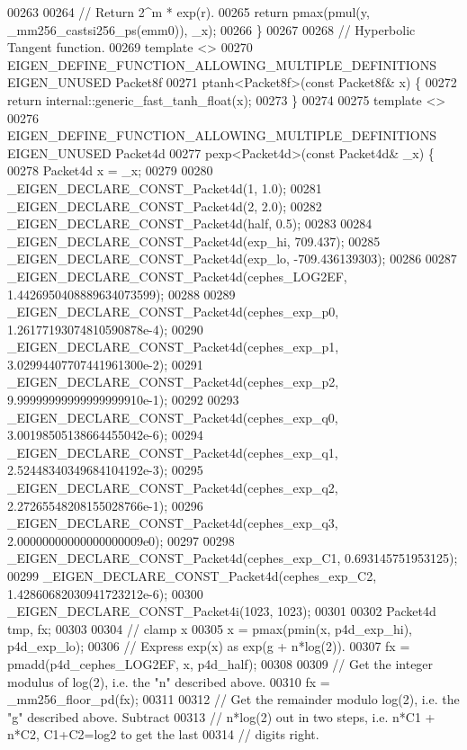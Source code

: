 \begin{DoxyCode}
00263 
00264   \textcolor{comment}{// Return 2^m * exp(r).}
00265   \textcolor{keywordflow}{return} pmax(pmul(y, \_mm256\_castsi256\_ps(emm0)), \_x);
00266 \}
00267 
00268 \textcolor{comment}{// Hyperbolic Tangent function.}
00269 \textcolor{keyword}{template} <>
00270 EIGEN\_DEFINE\_FUNCTION\_ALLOWING\_MULTIPLE\_DEFINITIONS EIGEN\_UNUSED Packet8f
00271 ptanh<Packet8f>(\textcolor{keyword}{const} Packet8f& x) \{
00272   \textcolor{keywordflow}{return} internal::generic\_fast\_tanh\_float(x);
00273 \}
00274 
00275 \textcolor{keyword}{template} <>
00276 EIGEN\_DEFINE\_FUNCTION\_ALLOWING\_MULTIPLE\_DEFINITIONS EIGEN\_UNUSED Packet4d
00277 pexp<Packet4d>(\textcolor{keyword}{const} Packet4d& \_x) \{
00278   Packet4d x = \_x;
00279 
00280   \_EIGEN\_DECLARE\_CONST\_Packet4d(1, 1.0);
00281   \_EIGEN\_DECLARE\_CONST\_Packet4d(2, 2.0);
00282   \_EIGEN\_DECLARE\_CONST\_Packet4d(half, 0.5);
00283 
00284   \_EIGEN\_DECLARE\_CONST\_Packet4d(exp\_hi, 709.437);
00285   \_EIGEN\_DECLARE\_CONST\_Packet4d(exp\_lo, -709.436139303);
00286 
00287   \_EIGEN\_DECLARE\_CONST\_Packet4d(cephes\_LOG2EF, 1.4426950408889634073599);
00288 
00289   \_EIGEN\_DECLARE\_CONST\_Packet4d(cephes\_exp\_p0, 1.26177193074810590878e-4);
00290   \_EIGEN\_DECLARE\_CONST\_Packet4d(cephes\_exp\_p1, 3.02994407707441961300e-2);
00291   \_EIGEN\_DECLARE\_CONST\_Packet4d(cephes\_exp\_p2, 9.99999999999999999910e-1);
00292 
00293   \_EIGEN\_DECLARE\_CONST\_Packet4d(cephes\_exp\_q0, 3.00198505138664455042e-6);
00294   \_EIGEN\_DECLARE\_CONST\_Packet4d(cephes\_exp\_q1, 2.52448340349684104192e-3);
00295   \_EIGEN\_DECLARE\_CONST\_Packet4d(cephes\_exp\_q2, 2.27265548208155028766e-1);
00296   \_EIGEN\_DECLARE\_CONST\_Packet4d(cephes\_exp\_q3, 2.00000000000000000009e0);
00297 
00298   \_EIGEN\_DECLARE\_CONST\_Packet4d(cephes\_exp\_C1, 0.693145751953125);
00299   \_EIGEN\_DECLARE\_CONST\_Packet4d(cephes\_exp\_C2, 1.42860682030941723212e-6);
00300   \_EIGEN\_DECLARE\_CONST\_Packet4i(1023, 1023);
00301 
00302   Packet4d tmp, fx;
00303 
00304   \textcolor{comment}{// clamp x}
00305   x = pmax(pmin(x, p4d\_exp\_hi), p4d\_exp\_lo);
00306   \textcolor{comment}{// Express exp(x) as exp(g + n*log(2)).}
00307   fx = pmadd(p4d\_cephes\_LOG2EF, x, p4d\_half);
00308 
00309   \textcolor{comment}{// Get the integer modulus of log(2), i.e. the "n" described above.}
00310   fx = \_mm256\_floor\_pd(fx);
00311 
00312   \textcolor{comment}{// Get the remainder modulo log(2), i.e. the "g" described above. Subtract}
00313   \textcolor{comment}{// n*log(2) out in two steps, i.e. n*C1 + n*C2, C1+C2=log2 to get the last}
00314   \textcolor{comment}{// digits right.}

\end{DoxyCode}
